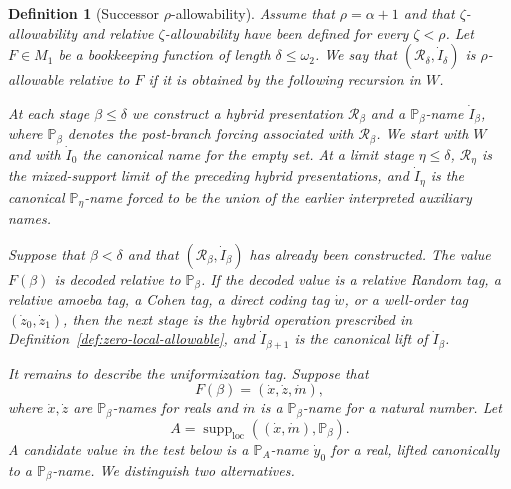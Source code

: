 \documentclass[a4paper,11pt]{article}
\newtheorem{definition}[theorem]{Definition}
\begin{document}
\begin{definition}[Successor \(\rho\)-allowability]
\label{def:rho-allowable-local}
Assume that \(\rho=\alpha+1\) and that \(\zeta\)-allowability and relative
\(\zeta\)-allowability have been defined for every \(\zeta<\rho\).  Let
\(F\in M_1\) be a bookkeeping function of length \(\delta\leq\omega_2\).  We
say that \((\mathcal R_\delta,\dot I_\delta)\) is \emph{\(\rho\)-allowable
relative to \(F\)} if it is obtained by the following recursion in \(W\).

At each stage \(\beta\leq\delta\) we construct a hybrid presentation
\(\mathcal R_\beta\) and a \(\mathbb P_\beta\)-name \(\dot I_\beta\), where
\(\mathbb P_\beta\) denotes the post-branch forcing associated with
\(\mathcal R_\beta\).
We start with $W$ and with \(\dot I_0\) the
canonical name for the empty set.  At a limit stage \(\eta\leq\delta\),
\(\mathcal R_\eta\) is the mixed-support limit of the preceding hybrid
presentations, and \(\dot I_\eta\) is the canonical \(\mathbb P_\eta\)-name
forced to be the union of the earlier interpreted auxiliary names.

Suppose that \(\beta<\delta\) and that \((\mathcal R_\beta,\dot I_\beta)\) has
already been constructed.  The value \(F(\beta)\) is decoded relative to
\(\mathbb P_\beta\).  If the decoded value is a relative Random tag, a relative amoeba tag, a Cohen
tag, a direct coding tag \(\dot w\), or a well-order tag
\((\dot z_0,\dot z_1)\), then the next stage is the hybrid operation
prescribed in Definition~\ref{def:zero-local-allowable}, and
\(\dot I_{\beta+1}\) is the canonical lift of \(\dot I_\beta\).

It remains to describe the uniformization tag.  Suppose that
\[
   F(\beta)=(\dot x,\dot z,\dot m),
\]
where \(\dot x,\dot z\) are \(\mathbb P_\beta\)-names for reals and \(\dot m\)
is a \(\mathbb P_\beta\)-name for a natural number.  Let
\[
   A=\operatorname{supp}_{\mathrm{loc}}((\dot x,\dot m),\mathbb P_\beta).
\]
A candidate value in the test below is a \(\mathbb P_A\)-name \(\dot y_0\) for
a real, lifted canonically to a \(\mathbb P_\beta\)-name.  We distinguish two
alternatives.


\end{definition}
\end{document}
